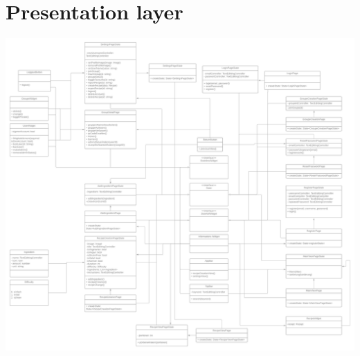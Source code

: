 \documentclass[parskip=full]{scrartcl}
\begin{document}
\section{Presentation layer}
    \includegraphics[width = 180mm]{entwurfsheft/images/Presentation-layer/Presentation-Layer.png}
    \newpage
\end{document}
